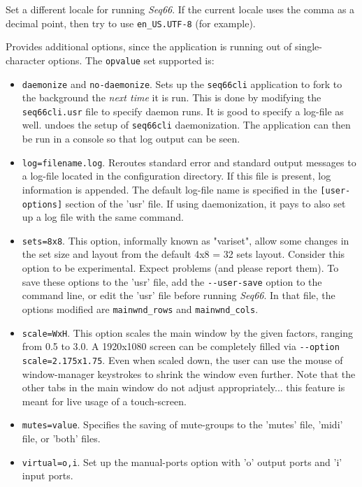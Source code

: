       Set a different locale for running \textsl{Seq66}.
      If the current locale uses the comma as a decimal point,
      then try to use \texttt{en\_US.UTF-8} (for example).

      Provides additional options, since the application is running out of
      single-character options.  The \texttt{opvalue} set supported is:
      \begin{itemize}
         \item \texttt{daemonize} and \texttt{no-daemonize}.
            Sets up the \texttt{seq66cli} application to fork to the background
            the \textsl{next time} it is run.
            This is done by modifying the \texttt{seq66cli.usr}
            file to specify daemon runs.
            It is good to specify a log-file as well.
            undoes the setup of \texttt{seq66cli} daemonization.
            The application can then be run in
            a console so that log output can be seen.
         \item \texttt{log=filename.log}.
            Reroutes standard error and standard
            output messages to a log-file located in
            the configuration directory.
            If this file is present, log information is appended.
            The default log-file name is specified in the
            \texttt{[user-options]} section of the 'usr' file.
            If using daemonization, it pays to also set up a log
            file with the same command.
         \item \texttt{sets=8x8}.
            This option, informally known as "variset", allow some changes in
            the set size and layout from the default 4x8 = 32 sets layout.
            Consider this option to be experimental.
            Expect problems (and please report them).
            To save these options to the 'usr' file, add the
            \texttt{-{}-user-save} option to the command line, or edit the
            'usr' file before running \textsl{Seq66}.
            In that file, the options modified are \texttt{mainwnd\_rows} and
            \texttt{mainwnd\_cols}.
         \item \texttt{scale=WxH}.
            This option scales the main window by the given factors,
            ranging from 0.5 to 3.0. A 1920x1080 screen can be completely
            filled via \texttt{-{}-option scale=2.175x1.75}. Even when scaled 
            down, the user can use the mouse of window-manager keystrokes to
            shrink the window even further.
            Note that the other tabs in the main window do not adjust
            appropriately... this feature is meant for live usage of
            a touch-screen.
         \item \texttt{mutes=value}. Specifies the saving of mute-groups
            to the 'mutes' file, 'midi' file, or 'both' files.
         \item \texttt{virtual=o,i}. Set up the manual-ports option with 'o'
            output ports and 'i' input ports.
      \end{itemize}


